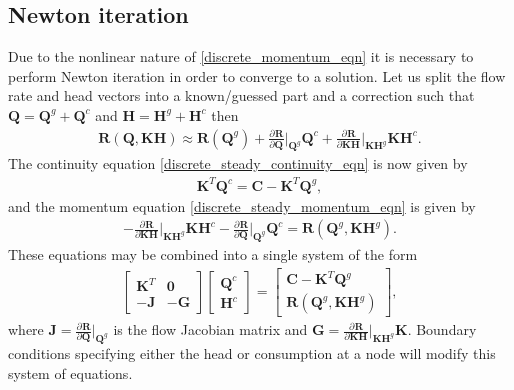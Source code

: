 \documentclass[12pt]{article}
\newcommand{\pardiv}[3]{\frac{\partial^{#1} #2}{\partial #3^{#1}}}
\begin{document}
\subsection{Newton iteration}

Due to the nonlinear nature of \eqref{discrete_momentum_eqn} it is necessary to perform Newton iteration in order to converge to a solution. Let us split the flow rate and head vectors into a known/guessed part and a correction such that $\mathbf{Q} = \mathbf{Q}^g + \mathbf{Q}^c$ and $\mathbf{H} = \mathbf{H}^g + \mathbf{H}^c$ then 
{ \color{green}
\begin{align*}
\mathbf{R}(\mathbf{Q}, \mathbf{K} \mathbf{H}) \approx \mathbf{R}(\mathbf{Q}^g) + \pardiv{}{\mathbf{R}}{\mathbf{Q}} \Bigg\vert_{\mathbf{Q}^g} \mathbf{Q}^c + \pardiv{}{\mathbf{R}}{\mathbf{K} \mathbf{H}} \Bigg\vert_{\mathbf{K} \mathbf{H}^g} \mathbf{K} \mathbf{H}^c.
\end{align*}}
The continuity equation \eqref{discrete_steady_continuity_eqn} is now given by
\begin{align}\label{discrete_steady_continuity_eqn_newton}
\mathbf{K}^T \mathbf{Q}^c = \mathbf{C} - \mathbf{K}^T \mathbf{Q}^g,
\end{align}
and the momentum equation \eqref{discrete_steady_momentum_eqn} is given by
{\color{green}
\begin{align}\label{discrete_steady_momentum_eqn_newton}
- \pardiv{}{\mathbf{R}}{\mathbf{K} \mathbf{H}} \Bigg\vert_{\mathbf{K} \mathbf{H}^g} \mathbf{K} \mathbf{H}^c - \pardiv{}{\mathbf{R}}{\mathbf{Q}} \Bigg\vert_{\mathbf{Q}^g} \mathbf{Q}^c  = \mathbf{R}(\mathbf{Q}^g, \mathbf{K} \mathbf{H}^g).
\end{align}
These equations may be combined into a single system of the form
\begin{align}\label{discrete_steady_system}
\begin{bmatrix}
\mathbf{K}^T & \mathbf{0} \\
-\mathbf{J} & -\mathbf{G}
\end{bmatrix} 
\begin{bmatrix}
\mathbf{Q}^c \\ \mathbf{H}^c
\end{bmatrix} = \begin{bmatrix}
\mathbf{C} - \mathbf{K}^T \mathbf{Q}^g \\
\mathbf{R}(\mathbf{Q}^g, \mathbf{K} \mathbf{H}^g)
\end{bmatrix},
\end{align}
where $\mathbf{J} = \pardiv{}{\mathbf{R}}{\mathbf{Q}} \big\vert_{\mathbf{Q}^g}$ is the flow Jacobian matrix and $\mathbf{G} = \pardiv{}{\mathbf{R}}{\mathbf{K} \mathbf{H}} \big\vert_{\mathbf{K} \mathbf{H}^g} \mathbf{K}$. Boundary conditions specifying either the head or consumption at a node will modify this system of equations. 
}
\end{document}
